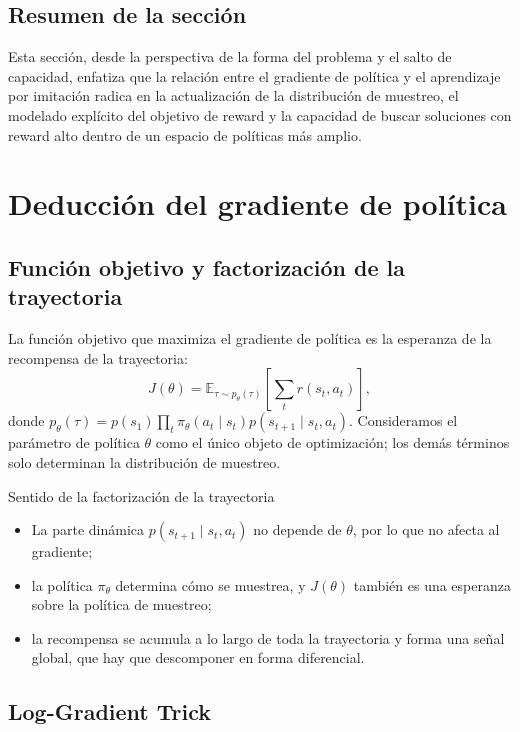 \documentclass[a4paper]{article}
\begin{document}
\subsection{Resumen de la sección}

Esta sección, desde la perspectiva de la forma del problema y el salto de capacidad, enfatiza que la relación entre el gradiente de política y el aprendizaje por imitación radica en la actualización de la distribución de muestreo, el modelado explícito del objetivo de reward y la capacidad de buscar soluciones con reward alto dentro de un espacio de políticas más amplio.

\section{Deducción del gradiente de política}

\subsection{Función objetivo y factorización de la trayectoria}

La función objetivo que maximiza el gradiente de política es la esperanza de la recompensa de la trayectoria:
$$J(\theta) = \mathbb{E}_{\tau \sim p_\theta(\tau)} \left[ \sum_t r(s_t, a_t) \right],$$
donde $p_\theta(\tau) = p(s_1)\prod_t \pi_\theta(a_t\mid s_t)p(s_{t+1}\mid s_t,a_t)$. Consideramos el parámetro de política $\theta$ como el único objeto de optimización; los demás términos solo determinan la distribución de muestreo.

\begin{knowledgebox}{Sentido de la factorización de la trayectoria}
\begin{itemize}
    \item La parte dinámica $p(s_{t+1}\mid s_t,a_t)$ no depende de $\theta$, por lo que no afecta al gradiente;
    \item la política $\pi_\theta$ determina cómo se muestrea, y $J(\theta)$ también es una esperanza sobre la política de muestreo;
    \item la recompensa se acumula a lo largo de toda la trayectoria y forma una señal global, que hay que descomponer en forma diferencial.
\end{itemize}
\end{knowledgebox}

\subsection{Log-Gradient Trick}
\end{document}
